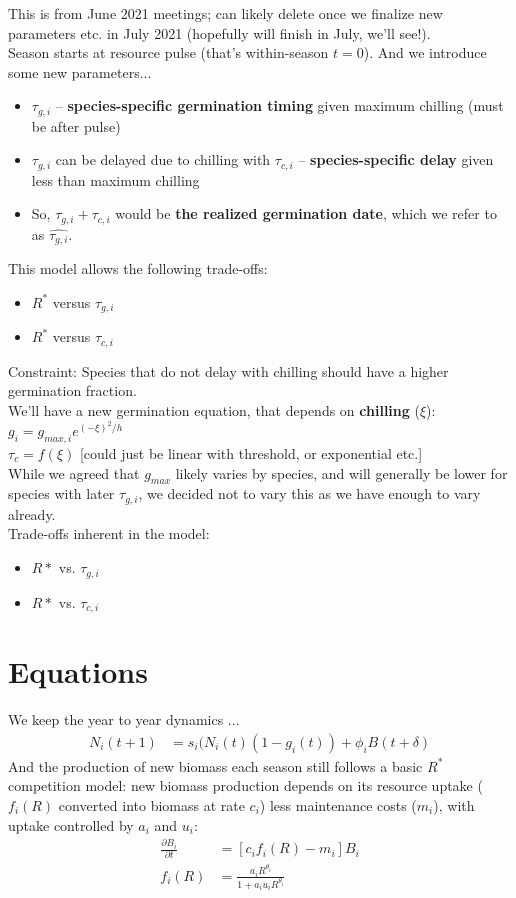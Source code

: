 \documentclass[11pt,letter]{article}
\begin{document}
This is from June 2021 meetings; can likely delete once we finalize new parameters etc. in July 2021 (hopefully will finish in July, we'll see!).\\

Season starts at resource pulse (that's within-season $t=0$). And we introduce some new parameters...
\begin{itemize}
\item $\tau_{g,i}$ -- {\bf species-specific germination timing} given maximum chilling (must be after pulse)
\item $\tau_{g,i}$ can be delayed due to chilling with $\tau_{c,i}$ -- {\bf species-specific delay} given less than maximum chilling
\item So, $\tau_{g,i} + \tau_{c,i}$ would be {\bf the realized germination date}, which we refer to as $\hat{\tau_{g,i}}$. 
\end{itemize}

This model allows the following trade-offs:
\begin{itemize}
\item $R^*$ versus $\tau_{g,i}$ 
\item $R^*$ versus $\tau_{c,i}$ 
\end{itemize}
Constraint: Species that do not delay with chilling should have a higher germination fraction.\\

We'll have a new germination equation, that depends on {\bf chilling} ($\xi$):
$g_i = g_{max, i}e^{(-\xi)^2/h}$\\
$\tau_c = f(\xi)$ [could just be linear with threshold, or exponential etc.]\\

While we agreed that $g_{max}$ likely varies by species, and will generally be lower for species with later $\tau_{g,i}$, we decided not to vary this as we have enough to vary already.\\

Trade-offs inherent in the model:
\begin{itemize}
\item $R*$ vs. $\tau_{g,i}$
\item $R*$ vs. $\tau_{c,i}$
\end{itemize}

\section{Equations} 
We keep the year to year dynamics ...
\begin{align}
N_{i}(t+1) & =
s_{i}(N_{i}(t)(1-g_{i}(t))+\phi_{i}B(t+\delta)
\end{align}
And the production of new biomass each season still follows a basic $R^*$ competition model: new biomass production depends on its resource uptake ($f_i(R)$ converted into biomass at rate $c_i$) less maintenance costs ($m_i$), with uptake controlled by $a_i$ and $u_i$:
\begin{align}
\frac{\partial B_{i}}{\partial t} &  = [c_{i}f_{i}(R) - m_{i}]B_{i} \\
f_{i}(R) & = \frac{a_{i}R^{\theta_{i}}}{1+a_{i}u_{i}R^{\theta_{i}}}
\end{align}
\end{document}
